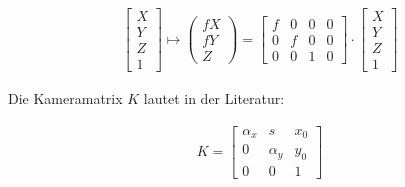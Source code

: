 \begin{gather}
\begin{bmatrix}
X\\Y\\Z\\1
\end{bmatrix} \mapsto
\begin{pmatrix}
f X\\ f Y\\ Z
\end{pmatrix}
=
\begin{bmatrix}
f&0&0&0\\
0&f&0&0\\
0&0&1&0
\end{bmatrix}
\cdot
\begin{bmatrix}
X\\Y\\Z\\1
\end{bmatrix}
\end{gather}		


Die Kameramatrix $K$ lautet in der Literatur\cite{HZ}:

\begin{gather}
K=\begin{bmatrix}
\alpha_x&s&x_{0}\\
0&\alpha_y&y_{0}\\
0&0&1
\end{bmatrix}
\end{gather}

